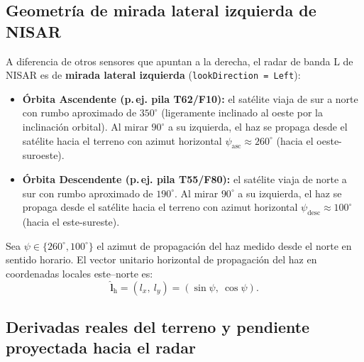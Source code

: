 \documentclass[11pt,a4paper]{article}
\begin{document}
\subsection{Geometría de mirada lateral izquierda de NISAR}
\label{sec:relieve3d-geometria-nisar}

A diferencia de otros sensores que apuntan a la derecha, el radar de banda L de NISAR es de \textbf{mirada
lateral izquierda} (\texttt{lookDirection = Left}):
\begin{itemize}
  \item \textbf{Órbita Ascendente (p.\,ej. pila T62/F10):} el satélite viaja de sur a norte con rumbo aproximado
        de $350^\circ$ (ligeramente inclinado al oeste por la inclinación orbital). Al mirar $90^\circ$ a su
        izquierda, el haz se propaga desde el satélite hacia el terreno con azimut horizontal
        $\psi_{\mathrm{asc}} \approx 260^\circ$ (hacia el oeste-suroeste).
  \item \textbf{Órbita Descendente (p.\,ej. pila T55/F80):} el satélite viaja de norte a sur con rumbo aproximado
        de $190^\circ$. Al mirar $90^\circ$ a su izquierda, el haz se propaga desde el satélite hacia el terreno
        con azimut horizontal $\psi_{\mathrm{desc}} \approx 100^\circ$ (hacia el este-sureste).
\end{itemize}

Sea $\psi \in \{260^\circ, 100^\circ\}$ el azimut de propagación del haz medido desde el norte en sentido
horario. El vector unitario horizontal de propagación del haz en coordenadas locales este--norte es:
\begin{equation}
  \hat{\mathbf l}_{\mathrm{h}} = (l_x,\ l_y) = \left(\sin\psi,\ \cos\psi\right).
  \label{eq:vector-haz-sar}
\end{equation}

\subsection{Derivadas reales del terreno y pendiente proyectada hacia el radar}
\label{sec:relieve3d-ecuaciones-sar}
\end{document}
